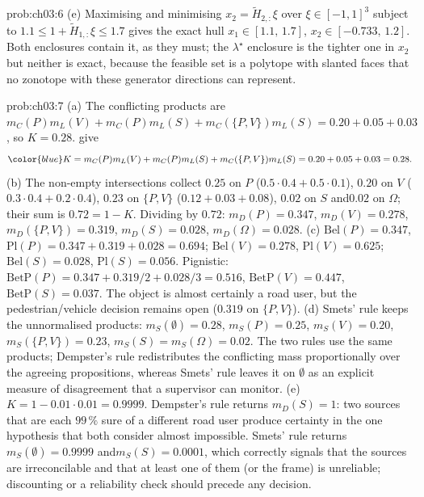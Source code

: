 \documentclass[graybox,envcountchap]{style/SNmono}
\providecommand{\DIFadd}[1]{{\protect\color{blue} #1}} %
\providecommand{\DIFdel}[1]{{\protect\color{red} #1}} %
\providecommand{\DIFaddbegin}{} %
\providecommand{\DIFaddend}{} %
\providecommand{\DIFdelbegin}{} %
\providecommand{\DIFdelend}{} %
\begin{document}
\begin{sol}{prob:ch03:6}
(e) Maximising and minimising $x_2=\tilde H_{2,:}\xi$ over $\xi\in[-1,1]^{3}$ subject to $1.1\le1+\tilde H_{1,:}\xi\le1.7$ gives the exact hull $x_1\in[1.1,\,1.7]$, $x_2\in[-0.733,\,1.2]$. Both enclosures contain it, as they must; the $\lambda^{\star}$ enclosure is the tighter one in $x_2$ but neither is exact, because the feasible set is a polytope with slanted faces that no zonotope with these generator directions can represent.
\end{sol}

\begin{sol}{prob:ch03:7}
(a) The conflicting products \DIFdelbegin \DIFdel{are $m_C(P)m_L(V)+m_C(P)m_L(S)+m_C(\{P,V\})m_L(S)=0.20+0.05+0.03$, so $K=0.28$.
}\DIFdelend \DIFaddbegin \DIFadd{give
}\[\DIFadd{K=m_C(P)m_L(V)+m_C(P)m_L(S)+m_C(\{P,V\})m_L(S)
=0.20+0.05+0.03=0.28.}\]
\DIFaddend (b) The non-empty intersections collect $0.25$ on $P$ ($0.5\cdot0.4+0.5\cdot0.1$), $0.20$ on $V$ ($0.3\cdot0.4+0.2\cdot0.4$), $0.23$ on $\{P,V\}$ ($0.12+0.03+0.08$), $0.02$ on $S$ and\DIFaddbegin \allowbreak \DIFaddend $0.02$ on $\Omega$; their sum is $0.72=1-K$. Dividing by $0.72$: $m_D(P)=0.347$, $m_D(V)=0.278$, $m_D(\{P,V\})=0.319$, $m_D(S)=0.028$, $m_D(\Omega)=0.028$.
(c) $\mathrm{Bel}(P)=0.347$, $\mathrm{Pl}(P)=0.347+0.319+0.028=0.694$; $\mathrm{Bel}(V)=0.278$, $\mathrm{Pl}(V)=0.625$; $\mathrm{Bel}(S)=0.028$, $\mathrm{Pl}(S)=0.056$. Pignistic: $\mathrm{BetP}(P)=0.347+0.319/2+0.028/3=0.516$, $\mathrm{BetP}(V)=0.447$, $\mathrm{BetP}(S)=0.037$. The object is almost certainly a road user, but the pedestrian/vehicle decision remains open ($0.319$ on $\{P,V\}$).
(d) Smets' rule keeps the unnormalised products: $m_S(\emptyset)=0.28$, $m_S(P)=0.25$, $m_S(V)=0.20$, $m_S(\{P,V\})=0.23$, $m_S(S)=m_S(\Omega)=0.02$. The two rules use the same products; Dempster's rule redistributes the conflicting mass proportionally over the agreeing propositions, whereas Smets' rule leaves it on $\emptyset$ as an explicit measure of disagreement that a supervisor can monitor.
(e) $K=1-0.01\cdot0.01=0.9999$. Dempster's rule returns $m_D(S)=1$: two sources that are each $99\,\%$ sure of a different road user produce certainty in the one hypothesis that both consider almost impossible. Smets' rule returns $m_S(\emptyset)=0.9999$ and\DIFaddbegin \allowbreak \DIFaddend $m_S(S)=0.0001$, which correctly signals that the sources are irreconcilable and that at least one of them (or the frame) is unreliable; discounting or a reliability check should precede any decision.
\end{sol}
\end{document}
